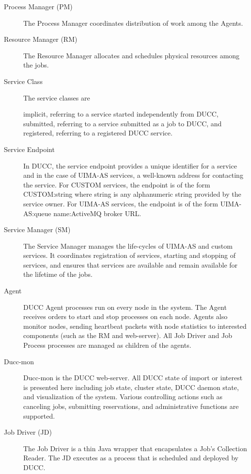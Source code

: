 \begin{description}
\item[Process Manager (PM) ] The Process Manager coordinates distribution of work among the Agents.

\item[Resource Manager (RM) ] The Resource Manager allocates and schedules physical resources among
  the jobs.

\item[Service Class ] The service classes are

implicit, referring to a service started independently from DUCC, 
submitted, referring to a service submitted as a job to DUCC, and 
registered, referring to a registered DUCC service. 


\item[Service Endpoint ] In DUCC, the service endpoint provides a unique identifier for a service
  and in the case of UIMA-AS services, a well-known address for contacting the service. For CUSTOM
  services, the endpoint is of the form CUSTOM:string where string is any alphanumeric string
  provided by the service owner. For UIMA-AS services, the endpoint is of the form UIMA-AS:queue
  name:ActiveMQ broker URL.

\item[Service Manager (SM)] The Service Manager manages the life-cycles of UIMA-AS and custom
  services. It coordinates registration of services, starting and stopping of services, and ensures
  that services are available and remain available for the lifetime of the jobs.

\item[Agent] DUCC Agent processes run on every node in the system. The Agent receives orders to
  start and stop processes on each node. Agents also monitor nodes, sending heartbeat packets with
  node statistics to interested components (such as the RM and web-server). All Job Driver and Job
  Process processes are managed as children of the agents.

\item[Ducc-mon]  Ducc-mon is the DUCC web-server. All DUCC state of import or interest is presented
  here including job state, cluster state, DUCC daemon state, and visualization of the system.
  Various controlling actions such as canceling jobs, submitting reservations, and administrative
  functions are supported.

\item[Job Driver (JD)]The Job Driver is a thin Java wrapper that encapsulates a Job's Collection
  Reader. The JD executes as a process that is scheduled and deployed by DUCC.


\end{description}
